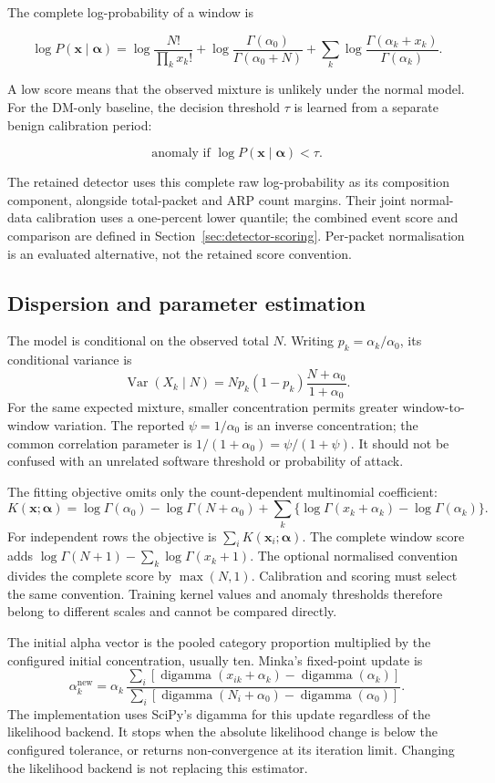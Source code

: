 The complete log-probability of a window is

\[
\log P(\mathbf{x}\mid\boldsymbol{\alpha})
=\log\frac{N!}{\prod_k x_k!}
+\log\frac{\Gamma(\alpha_0)}{\Gamma(\alpha_0+N)}
+\sum_k\log\frac{\Gamma(\alpha_k+x_k)}{\Gamma(\alpha_k)}.
\]

A low score means that the observed mixture is unlikely under the normal model.
For the DM-only baseline, the decision threshold $\tau$ is learned from a
separate benign calibration period:

\[
\text{anomaly if }\log P(\mathbf{x}\mid\boldsymbol{\alpha})<\tau.
\]

The retained detector uses this complete raw log-probability as its composition
component, alongside total-packet and ARP count margins. Their joint normal-data
calibration uses a one-percent lower quantile; the combined event score and
comparison are defined in Section~\ref{sec:detector-scoring}. Per-packet
normalisation is an evaluated alternative, not the retained score convention.

\subsection{Dispersion and parameter estimation}

The model is conditional on the observed total $N$. Writing
$p_k=\alpha_k/\alpha_0$, its conditional variance is
\[
\operatorname{Var}(X_k\mid N)
=N p_k(1-p_k)\frac{N+\alpha_0}{1+\alpha_0}.
\]
For the same expected mixture, smaller concentration permits greater
window-to-window variation. The reported $\psi=1/\alpha_0$ is an inverse
concentration; the common correlation parameter is
$1/(1+\alpha_0)=\psi/(1+\psi)$. It should not be confused with an unrelated
software threshold or probability of attack.

The fitting objective omits only the count-dependent multinomial coefficient:
\[
K(\mathbf{x};\boldsymbol{\alpha})=
\log\Gamma(\alpha_0)-\log\Gamma(N+\alpha_0)
+\sum_k\{\log\Gamma(x_k+\alpha_k)-\log\Gamma(\alpha_k)\}.
\]
For independent rows the objective is $\sum_iK(\mathbf{x}_i;\boldsymbol{\alpha})$.
The complete window score adds
$\log\Gamma(N+1)-\sum_k\log\Gamma(x_k+1)$.
The optional normalised convention divides the complete score by
$\max(N,1)$. Calibration and scoring must select the same convention.
Training kernel values and anomaly thresholds therefore belong to different
scales and cannot be compared directly.

The initial alpha vector is the pooled category proportion multiplied by the
configured initial concentration, usually ten. Minka's fixed-point update is
\[
\alpha_k^{\mathrm{new}}
=\alpha_k\,
\frac{\sum_i[\operatorname{digamma}(x_{ik}+\alpha_k)-\operatorname{digamma}(\alpha_k)]}
{\sum_i[\operatorname{digamma}(N_i+\alpha_0)-\operatorname{digamma}(\alpha_0)]}.
\]
The implementation uses SciPy's digamma for this update regardless of the
likelihood backend. It stops when the absolute likelihood change is below the
configured tolerance, or returns non-convergence at its iteration limit.
Changing the likelihood backend is not replacing this estimator.

